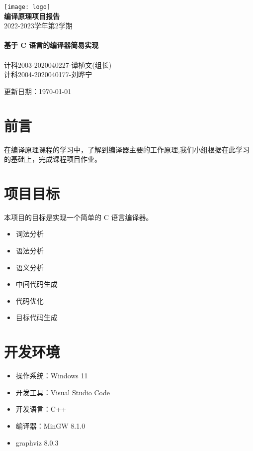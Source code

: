 \documentclass[cs4size,a4paper]{ctexart}
\begin{document}
\begin{titlepage}
\begin{center}
\texttt{[image: logo]}\\[1cm]    
\textsf{\LARGE\bfseries 编译原理项目报告}\\[1.0cm]
\textsc{\Large 2022-2023学年第2学期}\\[0.5cm]
\HRule \\[0.8cm]
{\huge \bfseries 基于 C 语言的编译器简易实现}\\[0.4cm]
\HRule \\[0.7cm] 
\textsc{计科2003-2020040227-谭植文(组长)}\\[0.4cm]
\textsc{计科2004-2020040177-刘晔宁}


\vfill
{更新日期：\today}
\newpage
\tableofcontents 
\end{center}
\end{titlepage}


\section{前言}
{\par 在编译原理课程的学习中，了解到编译器主要的工作原理,我们小组根据在此学习的基础上，完成课程项目作业。}
\section{项目目标}
{\par 本项目的目标是实现一个简单的 C 语言编译器。}
\begin{itemize}
    \item 词法分析
    \item 语法分析
    \item 语义分析
    \item 中间代码生成
    \item 代码优化
    \item 目标代码生成
\end{itemize}
\section{开发环境}
\begin{itemize}
    \item 操作系统：Windows 11
    \item 开发工具：Visual Studio Code
    \item 开发语言：C++
    \item 编译器：MinGW 8.1.0
    \item graphviz 8.0.3
\end{itemize}
\end{document}
